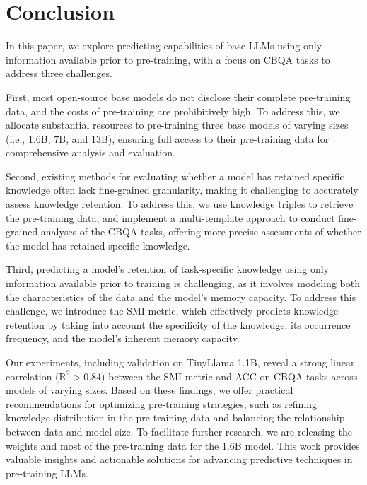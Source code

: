 \section{Conclusion}
\label{conclusion}
In this paper, we explore predicting capabilities of base LLMs using only information available prior to pre-training, with a focus on CBQA tasks to address three challenges.

First, most open-source base models do not disclose their complete pre-training data, and the costs of pre-training are prohibitively high. To address this, we allocate substantial resources to pre-training three base models of varying sizes (i.e., 1.6B, 7B, and 13B), ensuring full access to their pre-training data for comprehensive analysis and evaluation.

Second, existing methods for evaluating whether a model has retained specific knowledge often lack fine-grained granularity, making it challenging to accurately assess knowledge retention. To address this, we use knowledge triples to retrieve the pre-training data, and implement a multi-template approach to conduct fine-grained analyses of the CBQA tasks, offering more precise assessments of whether the model has retained specific knowledge.

Third, predicting a model’s retention of task-specific knowledge using only information available prior to training is challenging, as it involves modeling both the characteristics of the data and the model’s memory capacity. To address this challenge, we introduce the SMI metric, which effectively predicts knowledge retention by taking into account the specificity of the knowledge, its occurrence frequency, and the model’s inherent memory capacity.

Our experiments, including validation on TinyLlama 1.1B, reveal a strong linear correlation ($\text{R}^2 > 0.84$) between the SMI metric and ACC on CBQA tasks across models of varying sizes. Based on these findings, we offer practical recommendations for optimizing pre-training strategies, such as refining knowledge distribution in the pre-training data and balancing the relationship between data and model size. To facilitate further research, we are releasing the weights and most of the pre-training data for the 1.6B model. This work provides valuable insights and actionable solutions for advancing predictive techniques in pre-training LLMs.
